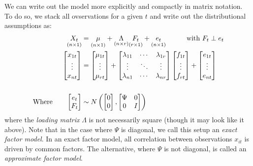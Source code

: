 \documentclass[12pt]{article}
\theoremstyle{plain}
\theoremstyle{definition}
\theoremstyle{remark}
\begin{document}
We can write out the model more explicitly and compactly in matrix
notation.  To do so, we stack all ovservations for a given $t$ and write
out the distributional assumptions as:
\begin{align}
  \underset{(n \times 1)}{X_t} &= \underset{(n \times 1)}{\mu} +
    \underset{(n \times r)}{\Lambda} \underset{(r \times 1)}{F_t}
    + \underset{(n \times 1)}{e_t}
    \qquad\quad \text{with } F_t \perp e_t
    \notag\\
  \begin{bmatrix} x_{1t} \\ \vdots \\ x_{nt} \end{bmatrix}
    &= \begin{bmatrix} \mu_{1t} \\ \vdots \\ \mu_{rt} \end{bmatrix}+
        \begin{bmatrix}
          \lambda_{11} & \cdots & \lambda_{1r} \\
          \vdots & \ddots & \vdots \\
          \lambda_{n1} & \cdots & \lambda_{nr}
        \end{bmatrix}
      \begin{bmatrix} f_{1t} \\ \vdots \\ f_{rt} \end{bmatrix}
      +  \begin{bmatrix} e_{1t} \\ \vdots \\ e_{nt} \end{bmatrix}
      \label{fm} \\\notag\\
  \text{Where} \qquad
    \begin{bmatrix} e_t \\ F_t \end{bmatrix} &\sim
    N\left(
      \begin{bmatrix} 0 \\ 0 \end{bmatrix} ,
      \begin{bmatrix}
        \Psi & 0 \\
        0 & I \\
      \end{bmatrix}
      \right)\label{fmjoint}
\end{align}
where the \emph{loading matrix} $\Lambda$ is not necessarily square
(though it may look like it above). Note that in the case where $\Psi$
is diagonal, we call this setup an \emph{exact factor model}. In an
exact factor model, all correlation between observations $x_{it}$ is
driven by common factors. The alternative, where $\Psi$ is not diagonal,
is called an \emph{approximate factor model}.
\end{document}
